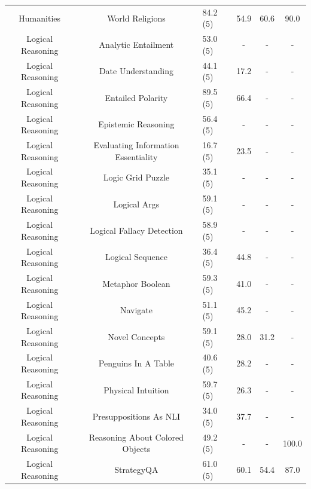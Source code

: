 \documentclass[11pt, a4paper, logo, internal, copyright, nonumbering]{deepmind}
\begin{document}
\begin{center}
\begin{longtable}{cclccc}
             Humanities &                      World Religions &   84.2 (5) &  54.9 &  60.6 &         90.0 \\
      Logical Reasoning &                   Analytic Entailment &   53.0 (5) &   - &   - &          - \\
      Logical Reasoning &                  Date Understanding &   44.1 (5) &  17.2 &   - &          - \\
      Logical Reasoning &                     Entailed Polarity &   89.5 (5) &  66.4 &   - &          - \\
      Logical Reasoning &                   Epistemic Reasoning &   56.4 (5) &   - &   - &          - \\
      Logical Reasoning &   Evaluating Information Essentiality &   16.7 (5) &  23.5 &   - &          - \\
      Logical Reasoning &                     Logic Grid Puzzle &   35.1 (5) &   - &   - &          - \\
      Logical Reasoning &                          Logical Args &   59.1 (5) &   - &   - &          - \\
      Logical Reasoning &             Logical Fallacy Detection &   58.9 (5) &   - &   - &          - \\
      Logical Reasoning &                      Logical Sequence &   36.4 (5) &  44.8 &   - &          - \\
      Logical Reasoning &                      Metaphor Boolean &   59.3 (5) &  41.0 &   - &          - \\
      Logical Reasoning &                            Navigate &   51.1 (5) &  45.2 &   - &          - \\
      Logical Reasoning &                      Novel Concepts &   59.1 (5) &  28.0 &  31.2 &          - \\
      Logical Reasoning &                 Penguins In A Table &   40.6 (5) &  28.2 &   - &          - \\
      Logical Reasoning &                  Physical Intuition &   59.7 (5) &  26.3 &   - &          - \\
      Logical Reasoning &              Presuppositions As NLI &   34.0 (5) &  37.7 &   - &          - \\
      Logical Reasoning &       Reasoning About Colored Objects &   49.2 (5) &   - &   - &        100.0 \\
      Logical Reasoning &                          StrategyQA &   61.0 (5) &  60.1 &  54.4 &         87.0 \\

\end{longtable}
\end{center}
\end{document}
